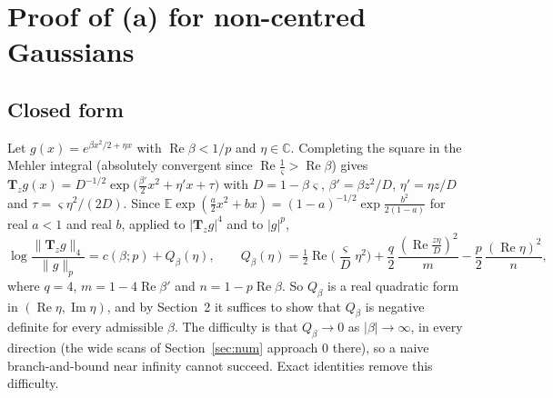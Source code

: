 \documentclass[11pt]{amsart}
\theoremstyle{definition}
\newcommand{\E}{\mathbb{E}}
\newcommand{\C}{\mathbb{C}}
\newcommand{\Rea}{\operatorname{Re}}
\newcommand{\Ima}{\operatorname{Im}}
\newcommand{\bT}{\mathbf{T}}
\begin{document}
\section{Proof of (a) for non-centred Gaussians}\label{sec:noncentred}
\subsection{Closed form}
Let $g(x)=e^{\beta x^2/2+\eta x}$ with $\Rea\beta<1/p$ and $\eta\in\C$. Completing the square in the Mehler
integral (absolutely convergent since $\Rea\frac1\varsigma>\Rea\beta$) gives
$\bT_zg(x)=D^{-1/2}\exp\big(\frac{\beta'}2x^2+\eta'x+\tau\big)$ with $D=1-\beta\varsigma$, $\beta'=\beta z^2/D$,
$\eta'=\eta z/D$ and $\tau=\varsigma\eta^2/(2D)$. Since
$\E\exp(\frac a2x^2+bx)=(1-a)^{-1/2}\exp\frac{b^2}{2(1-a)}$ for real $a<1$ and real $b$, applied to $|\bT_zg|^4$ and to
$|g|^p$,
\[
\log\frac{\|\bT_zg\|_4}{\|g\|_p}=c(\beta;p)+Q_\beta(\eta),\qquad
Q_\beta(\eta)=\tfrac12\Rea\Big(\frac\varsigma D\eta^2\Big)+\frac{q}{2}\,\frac{(\Rea\frac{z\eta}D)^2}{m}
-\frac p2\,\frac{(\Rea\eta)^2}{n},
\]
where $q=4$, $m=1-4\Rea\beta'$ and $n=1-p\Rea\beta$. So $Q_\beta$ is a real quadratic form in $(\Rea\eta,\Ima\eta)$,
and by Section~2 it suffices to show that $Q_\beta$ is negative definite for every admissible $\beta$. The difficulty
is that $Q_\beta\to0$ as $|\beta|\to\infty$, in every direction (the wide scans of Section~\ref{sec:num} approach $0$
there), so a naive branch-and-bound near infinity cannot succeed. Exact identities remove this difficulty.
\end{document}
